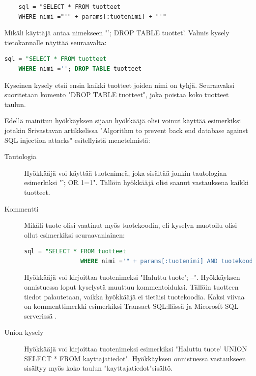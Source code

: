 \documentclass[finnish]{tktltiki2}
\theoremstyle{definition}
\theoremstyle{remark}
\begin{document}
	\begin{lstlisting}
	sql = "SELECT * FROM tuotteet
	WHERE nimi ="'" + params[:tuotenimi] + "'"
	\end{lstlisting}
	
	Mikäli käyttäjä antaa nimekseen "\space'; DROP TABLE tuottet'. Valmis kysely tietokannalle näyttää seuraavalta:
	
	\begin{lstlisting}[language=sql]
	sql = "SELECT * FROM tuotteet
	WHERE nimi =''; DROP TABLE tuotteet     
	\end{lstlisting}
	
	Kyseinen kysely etsii ensin kaikki tuotteet joiden nimi on tyhjä. Seuraavaksi suoritetaan komento "DROP TABLE tuotteet", joka poistaa koko tuotteet taulun.
	
	 Edellä mainitun hyökkäyksen sijaan hyökkääjä olisi voinut käyttää esimerkiksi jotakin Srivastavan artikkelissa "Algorithm to prevent back end database against SQL injection attacks"\space \cite{piggy} esitellyistä menetelmistä:  
		\begin{description}
			
		\item[Tautologia] \hfill
		
		Hyökkääjä voi käyttää tuotenimeä, joka sisältää jonkin tautologian esimerkiksi "'; OR 1=1". Tällöin hyökkääjä olisi saanut vastauksena kaikki tuotteet.
		
		\item[Kommentti] \hfill
		
		Mikäli tuote olisi vaatinut myös tuotekoodin, eli kyselyn muotoilu olisi ollut esimerkiksi seuraavanlainen:
			\begin{lstlisting}[language=sql]
				sql = "SELECT * FROM tuotteet
				WHERE nimi ='" + params[:tuotenimi] AND tuotekoodi ='"params[:tuotekoodi]"'
			\end{lstlisting}
			Hyökkääjä voi kirjoittaa tuotenimeksi "Haluttu tuote'; --". Hyökkäyksen onnistuessa loput kyselystä muuttuu kommentoiduksi. Tällöin tuotteen tiedot palautetaan, vaikka hyökkääjä ei tietäisi tuotekoodia. Kaksi viivaa on kommenttimerkki esimerkiksi Transact-SQL:llässä ja Micorosft SQL serverissä \cite{kommentti}.
			
		\item[Union kysely] \hfill
		
		Hyökkääjä voi kirjoittaa tuotenimeksi esimerkiksi "Haluttu tuote' UNION SELECT * FROM kayttajatiedot". Hyökkäyksen onnistuessa vastaukseen sisältyy myös koko taulun "kayttajatiedot"\space sisältö.
	\end{description}
	
\end{document}
